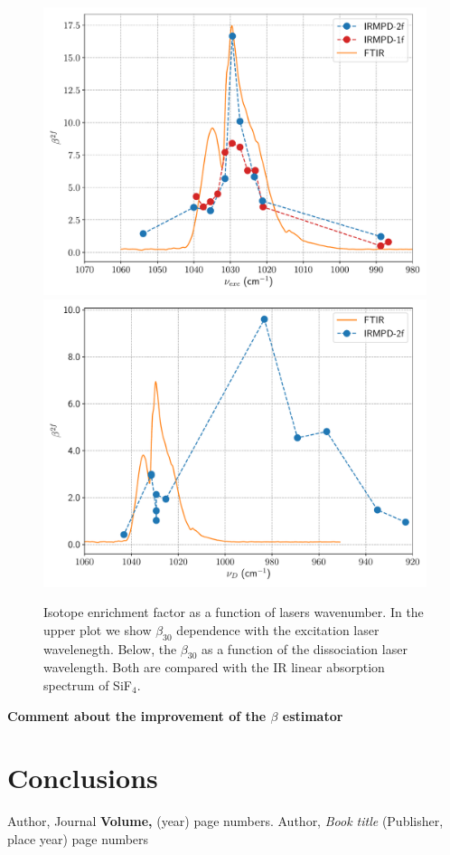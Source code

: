 \documentclass[global,twocolumn]{svjour}
\begin{document}
\begin{figure}[h]
	\centering
	\includegraphics[width = 1\linewidth]{figures/beta_30_nu_bombeo.pdf}
	\includegraphics[width = 1\linewidth]{figures/beta_30_nu_diso.pdf}
	\caption{\label{fig:beta_spec} Isotope enrichment factor as a function of lasers wavenumber. In the upper plot we show $\beta_{30}$ dependence with the excitation laser wavelenegth. Below, the $\beta_{30}$ as a function of the dissociation laser wavelength. Both are compared with the IR linear absorption spectrum of SiF$_{4}$.}
\end{figure}

\textbf{Comment about the improvement of the $\beta$ estimator}

\section{Conclusions}

\begin{thebibliography}{}
	Author, Journal \textbf{Volume,} (year) page numbers.
	Author, \textit{Book title} (Publisher, place year) page numbers
\end{thebibliography}
	
	
\end{document}
